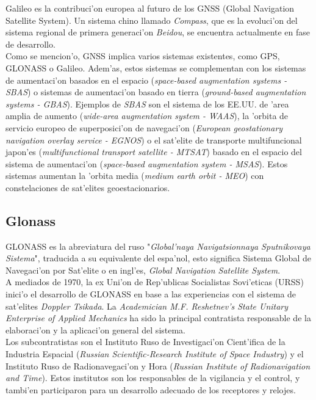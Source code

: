 Galileo es la contribuci'on europea al futuro de los GNSS (Global Navigation Satellite System). Un sistema chino llamado \emph{Compass}, que es la evoluci'on del sistema regional de primera generaci'on \emph{Beidou}, se encuentra actualmente en fase de desarrollo.\\

Como se mencion'o, GNSS \cite{hofmann-wellenhof_gnss--global_2008} implica varios sistemas existentes, como GPS, GLONASS o Galileo. Adem'as, estos sistemas se complementan con los sistemas de aumentaci'on basados en el espacio (\emph{space-based augmentation systems - SBAS}) o sistemas de aumentaci'on basado en tierra (\emph{ground-based augmentation systems - GBAS}). Ejemplos de \emph{SBAS} son el sistema de los EE.UU. de 'area amplia de aumento (\emph{wide-area augmentation system - WAAS}), la 'orbita de servicio europeo de superposici'on de navegaci'on (\emph{European geostationary navigation overlay service - EGNOS}) o el sat'elite de transporte multifuncional japon'es (\emph{multifunctional transport satellite - MTSAT}) basado en el espacio del sistema de aumentaci'on (\emph{space-based augmentation system - MSAS}). Estos sistemas aumentan la 'orbita media (\emph{medium earth orbit - MEO}) con constelaciones de sat'elites geoestacionarios.

\subsection{Glonass}
\noindent
GLONASS es la abreviatura del ruso "\emph{Global'naya Navigatsionnaya Sputnikovaya Sistema}", traducida a su equivalente del espa'nol, esto significa Sistema Global de Navegaci'on por Sat'elite o en ingl'es, \emph{Global Navigation Satellite System}.\\

A mediados de 1970, la ex Uni'on de Rep'ublicas Socialistas Sovi'eticas (URSS) inici'o el desarrollo de GLONASS en base a las experiencias con el sistema de sat'elites \emph{Doppler Tsikada}. La \emph{Academician M.F. Reshetnev's State Unitary Enterprise of Applied Mechanics} ha sido la principal contratista responsable de la elaboraci'on y la aplicaci'on general del sistema.\\

Los subcontratistas son el Instituto Ruso de Investigaci'on Cient'ifica de la Industria Espacial (\emph{Russian Scientific-Research Institute of Space Industry}) y el Instituto Ruso de Radionavegaci'on y Hora (\emph{Russian Institute of Radionavigation and Time}). Estos institutos son los responsables de la vigilancia y el control, y tambi'en participaron para un desarrollo adecuado de los receptores y relojes.\\

